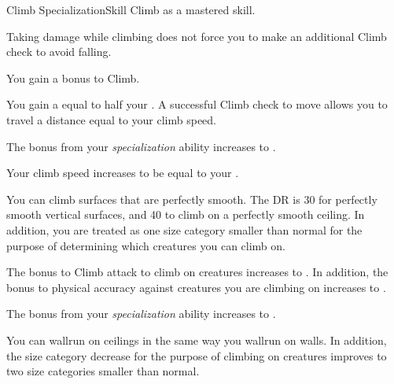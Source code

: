     \begin{feat}{Climb Specialization}{Skill}
        \featpre Climb as a mastered skill.

         Taking damage while climbing does not force you to make an additional Climb check to avoid falling.

         You gain a  bonus to Climb.

         You gain a  equal to half your .
        A successful Climb check to move allows you to travel a distance equal to your climb speed.


         The bonus from your \textit{specialization} ability increases to .

         Your climb speed increases to be equal to your .

         You can climb surfaces that are perfectly smooth.
        The DR is 30 for perfectly smooth vertical surfaces, and 40 to climb on a perfectly smooth ceiling.
        In addition, you are treated as one size category smaller than normal for the purpose of determining which creatures you can climb on.

         The bonus to Climb attack to climb on creatures increases to .
        In addition, the bonus to physical accuracy against creatures you are climbing on increases to .

         The bonus from your \textit{specialization} ability increases to .

         You can wallrun on ceilings in the same way you wallrun on walls.
        In addition, the size category decrease for the purpose of climbing on creatures improves to two size categories smaller than normal.
    \end{feat}

